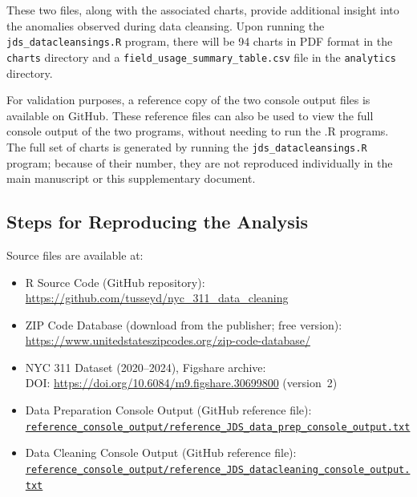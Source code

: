 \documentclass[linenumber]{jdsart}
\begin{document}
These two files, along with the associated charts, provide additional insight 
into the anomalies observed during data cleansing. Upon running 
the \texttt{jds\_datacleansings.R} program, there will be 94 charts in PDF format in 
the \texttt{charts} directory and a \texttt{field\_usage\_summary\_table.csv}
file in the \texttt{analytics} directory. 


For validation purposes, a reference copy of the two console output files is
available on GitHub. These reference files can also be used to view the full console
output of the two programs, without needing to run the .R programs. The full set of
charts is generated by running the \texttt{jds\_datacleansings.R} program;
because of their number, they are not reproduced individually in the main manuscript
or this supplementary document.


\subsection*{Steps for Reproducing the Analysis}
Source files are available at:


\begin{itemize}

\item R Source Code (GitHub repository):\\
\url{https://github.com/tusseyd/nyc_311_data_cleaning}

\item ZIP Code Database (download from the publisher; free version):\\
\url{https://www.unitedstateszipcodes.org/zip-code-database/}

\item NYC 311 Dataset (2020--2024), Figshare archive:\\
DOI: \url{https://doi.org/10.6084/m9.figshare.30699800} (version~2)

\item Data Preparation Console Output (GitHub reference file):\\
\href{https://github.com/tusseyd/nyc_311_data_cleaning/blob/main/reference_console_output/reference_JDS_data_prep_console_output.txt}{\texttt{reference\_console\_output/reference\_JDS\_data\_prep\_console\_output.txt}}

\item Data Cleaning Console Output (GitHub reference file):\\
\href{https://github.com/tusseyd/nyc_311_data_cleaning/blob/main/reference_console_output/reference_JDS_datacleaning_console_output.txt}{\texttt{reference\_console\_output/reference\_JDS\_datacleaning\_console\_output.txt}}

\end{itemize}
\end{document}
